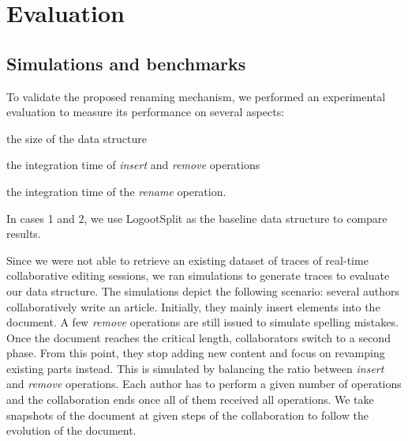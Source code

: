 \documentclass[sigplan,10pt]{acmart}
\begin{document}
\section{Evaluation}
\label{sec:evaluation}

\subsection{Simulations and benchmarks}

To validate the proposed renaming mechanism, we performed an experimental evaluation to measure its performance on several aspects:
\begin{enumerate*}
    \item the size of the data structure
    \item the integration time of \emph{insert} and \emph{remove} operations
    \item the integration time of the \emph{rename} operation.
\end{enumerate*}
In cases 1 and 2, we use LogootSplit as the baseline data structure to compare results.

Since we were not able to retrieve an existing dataset of traces of real-time collaborative editing sessions, we ran simulations to generate traces to evaluate our data structure.
The simulations depict the following scenario: several authors collaboratively write an article.
Initially, they mainly insert elements into the document.
A few \emph{remove} operations are still issued to simulate spelling mistakes.
Once the document reaches the critical length, collaborators switch to a second phase.
From this point, they stop adding new content and focus on revamping existing parts instead.
This is simulated by balancing the ratio between \emph{insert} and \emph{remove} operations.
Each author has to perform a given number of operations and the collaboration ends once all of them received all operations.
We take snapshots of the document at given steps of the collaboration to follow the evolution of the document.
\end{document}
